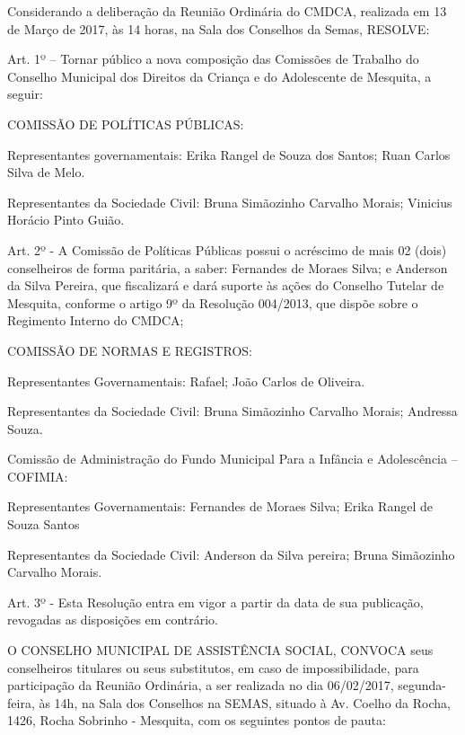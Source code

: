 \documentclass{doliberto}
\begin{document}
Considerando  a  deliberação  da  Reunião  Ordinária  do 
CMDCA, realizada em 13 de Março de 2017, às 14 horas, na 
Sala dos Conselhos da Semas, RESOLVE:   

Art. 1º – Tornar público a nova composição das Comissões 
de Trabalho do Conselho Municipal dos Direitos da Criança 
e do Adolescente de Mesquita, a seguir: 

COMISSÃO DE POLÍTICAS PÚBLICAS:  
 
Representantes  governamentais:  Erika  Rangel  de  Souza 
dos Santos; Ruan Carlos Silva de Melo.  
 
Representantes  da  Sociedade  Civil:  Bruna  Simãozinho 
Carvalho Morais; Vinicius Horácio Pinto Guião.  
 
Art.  2º  -  A  Comissão  de  Políticas  Públicas  possui  o 
acréscimo  de  mais  02  (dois)  conselheiros  de  forma 
paritária, a saber: Fernandes de Moraes Silva; e Anderson da 
Silva  Pereira,  que  fiscalizará  e  dará  suporte  às  ações  do 
Conselho  Tutelar  de  Mesquita,  conforme  o  artigo  9º  da 
Resolução  004/2013,  que  dispõe  sobre  o  Regimento 
Interno do CMDCA;  
 
COMISSÃO DE NORMAS E REGISTROS: 
 
Representantes  Governamentais: 
Rafael; João Carlos de Oliveira. 
 
Representantes  da  Sociedade  Civil:  Bruna  Simãozinho 
Carvalho Morais; Andressa Souza. 
 
Comissão de Administração do Fundo Municipal Para a 
Infância e Adolescência – COFIMIA: 
 
Representantes  Governamentais:  Fernandes  de  Moraes 
Silva; Erika Rangel de Souza Santos 
 
Representantes  da  Sociedade  Civil:  Anderson  da  Silva 
pereira; Bruna Simãozinho Carvalho Morais. 
 
Art. 3º - Esta Resolução entra em vigor a partir da data de 
sua publicação, revogadas as disposições em contrário. 



O  CONSELHO  MUNICIPAL  DE  ASSISTÊNCIA  SOCIAL, 
CONVOCA  seus  conselheiros  titulares  ou  seus  substitutos, 
em  caso  de  impossibilidade,  para  participação  da  Reunião 
Ordinária,  a  ser  realizada  no  dia  06/02/2017,  segunda-
feira, às 14h, na Sala dos Conselhos na SEMAS, situado à Av. 
Coelho da Rocha, 1426, Rocha Sobrinho - Mesquita, com os 
seguintes pontos de pauta: 
\end{document}
